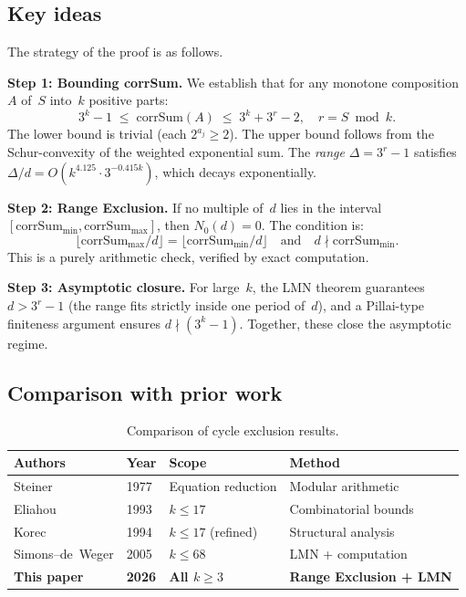 \documentclass[11pt, a4paper]{amsart}
\theoremstyle{plain}
\theoremstyle{definition}
\theoremstyle{remark}
\newcommand{\corrSum}{\mathrm{corrSum}}
\begin{document}
\subsection{Key ideas}\label{ssec:key-ideas}

The strategy of the proof is as follows.

\textbf{Step 1: Bounding corrSum.}
We establish that for any monotone composition~$A$ of~$S$ into~$k$
positive parts:
\begin{equation}\label{eq:bounds}
  3^k - 1 \;\leq\; \corrSum(A) \;\leq\; 3^k + 3^r - 2,
  \quad r = S \bmod k.
\end{equation}
The lower bound is trivial (each $2^{a_j} \geq 2$).  The upper bound
follows from the Schur-convexity of the weighted exponential sum.
The \emph{range} $\Delta = 3^r - 1$ satisfies
$\Delta/d = O(k^{4.125} \cdot 3^{-0.415k})$, which decays
exponentially.

\textbf{Step 2: Range Exclusion.}
If no multiple of~$d$ lies in the interval
$[\corrSum_{\min}, \corrSum_{\max}]$, then $N_0(d) = 0$.
The condition is:
\begin{equation}\label{eq:re-condition}
  \lfloor \corrSum_{\max}/d \rfloor = \lfloor \corrSum_{\min}/d \rfloor
  \quad\text{and}\quad
  d \nmid \corrSum_{\min}.
\end{equation}
This is a purely arithmetic check, verified by exact computation.

\textbf{Step 3: Asymptotic closure.}
For large~$k$, the LMN theorem guarantees $d > 3^r - 1$
(the range fits strictly inside one period of~$d$), and a
Pillai-type finiteness argument ensures $d \nmid (3^k - 1)$.
Together, these close the asymptotic regime.

\subsection{Comparison with prior work}\label{ssec:comparison}

\begin{table}[ht]
\centering
\caption{Comparison of cycle exclusion results.}
\label{tab:comparison}
\begin{tabular}{llll}
\toprule
Authors & Year & Scope & Method \\
\midrule
Steiner & 1977 & Equation reduction & Modular arithmetic \\
Eliahou & 1993 & $k \leq 17$ & Combinatorial bounds \\
Korec & 1994 & $k \leq 17$ (refined) & Structural analysis \\
Simons--de~Weger & 2005 & $k \leq 68$ & LMN + computation \\
\textbf{This paper} & \textbf{2026} & \textbf{All $k \geq 3$} & \textbf{Range Exclusion + LMN} \\
\bottomrule
\end{tabular}
\end{table}
\end{document}

